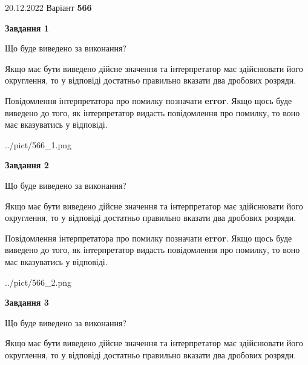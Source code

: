 \documentclass[12pt, ukrainian]{article}
\begin{document}
{20.12.2022 Варіант \No \textbf { 566 }\par}
{
\begin {Large}

{\begin {center}\textbf{Завдання 1}\end {center}}\par
Що буде виведено за виконання? \par

Якщо має бути виведено дійсне значення та інтерпретатор має здійснювати його округлення, 
то у відповіді достатньо правильно вказати два дробових розряди.

Повідомлення інтерпретатора про помилку позначати \textbf{error}.
Якщо щось буде виведено до того, як інтерпретатор видасть повідомлення про помилку, 
то воно має вказуватись у відповіді. \par

\begin{center}
	{../pict/566_1.png}
\end{center}
\newpage

{\begin {center}\textbf{Завдання 2}\end {center}}\par
Що буде виведено за виконання? \par

Якщо має бути виведено дійсне значення та інтерпретатор має здійснювати його округлення, 
то у відповіді достатньо правильно вказати два дробових розряди.

Повідомлення інтерпретатора про помилку позначати \textbf{error}.
Якщо щось буде виведено до того, як інтерпретатор видасть повідомлення про помилку, 
то воно має вказуватись у відповіді. \par

\begin{center}
	{../pict/566_2.png}
\end{center}
\newpage

{\begin {center}\textbf{Завдання 3}\end {center}}\par
Що буде виведено за виконання? \par

Якщо має бути виведено дійсне значення та інтерпретатор має здійснювати його округлення, 
то у відповіді достатньо правильно вказати два дробових розряди.


\end{Large}}
\end{document}
